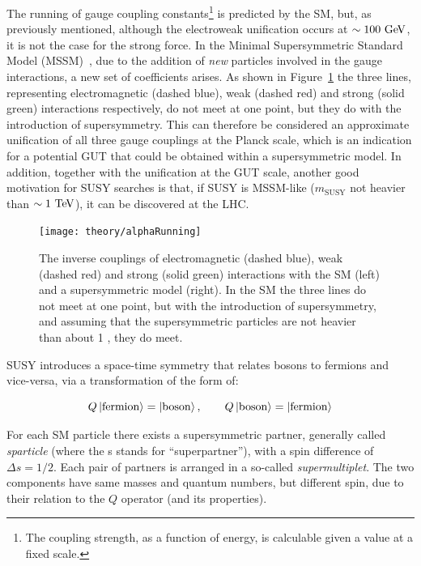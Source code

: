 		The running of gauge coupling constants\footnote{The coupling strength, as a function of energy, is calculable given a value at a fixed scale.} is predicted by the \ac{SM}, but, as previously mentioned, although the electroweak unification occurs at $\sim 100 \GeV$, it is not the case for the strong force. In the Minimal Supersymmetric Standard Model (MSSM)~\cite{Jegerlehner:2013nna}, due to the addition of \emph{new} particles involved in the gauge interactions, a new set of coefficients arises. As shown in Figure~\ref{fig:alphaRunning} the three lines, representing electromagnetic (dashed blue), weak (dashed red) and strong (solid green) interactions respectively, do not meet at one point, but they do with the introduction of supersymmetry. This can therefore be considered an approximate unification of all three gauge couplings at the Planck scale, which is an indication for a potential \ac{GUT} that could be obtained within a supersymmetric model. In addition, together with the unification at the \ac{GUT} scale, another good motivation for \ac{SUSY} searches is that, if \ac{SUSY} is \ac{MSSM}-like ($m_{\mathrm{SUSY}}$ not heavier than $\sim 1 \TeV$), it can be discovered at the \ac{LHC}.  
	
		\begin{figure}[!htb]
			\centering
			\texttt{[image: theory/alphaRunning]}
			\caption{\label{fig:alphaRunning} The inverse couplings of electromagnetic (dashed blue), weak (dashed red) and strong (solid green) interactions with the \ac{SM} (left) and a supersymmetric model (right). In the \ac{SM} the three lines do not meet at one point, but with the introduction of supersymmetry, and assuming that the supersymmetric particles are not heavier than about 1 \TeV, they do meet.}
		\end{figure}		

		\ac{SUSY} introduces a space-time symmetry that relates bosons to fermions and vice-versa, via a transformation of the form of:  

		\begin{equation}
		\label{eq:susy_transformation}
			Q \ket{\mathrm{fermion}} = \ket{\mathrm{boson}}, \qquad Q \ket{\mathrm{boson}} = \ket{\mathrm{fermion}}
		\end{equation}

		\noindent For each \ac{SM} particle there exists a supersymmetric partner, generally called \textit{sparticle} (where the s stands for “superpartner”), with a spin difference of $\Delta s = 1/2$. Each pair of partners is arranged in a so-called \textit{supermultiplet}. The two components have same masses and quantum numbers, but different spin, due to their relation to the $Q$ operator (and its properties). 

